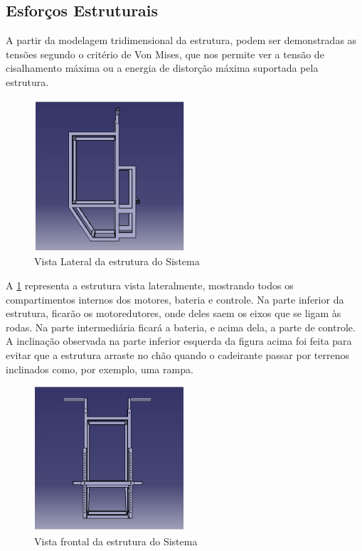  \subsection{Esforços Estruturais}

A partir da modelagem tridimensional da estrutura, podem ser demonstradas as tensões segundo o critério de Von Mises, que nos permite ver a tensão de cisalhamento máxima ou a energia de distorção máxima suportada pela estrutura.

\begin{figure}[!htb]
\centering
\includegraphics[width=0.5\textwidth]{figuras/resultados/vista_lateral_estrutura}
\caption{Vista Lateral da estrutura do Sistema}
\label{fig:vista_lateral_estrutura}
\end{figure}

A \ref{fig:vista_lateral_estrutura} representa a estrutura vista lateralmente, mostrando todos os compartimentos internos dos motores, bateria e controle. Na parte inferior da estrutura, ficarão os motoredutores, onde deles saem os eixos que se ligam às rodas. Na parte intermediária ficará a bateria, e acima dela, a parte de controle. A inclinação observada na parte inferior esquerda da figura acima foi feita para evitar que a estrutura arraste no chão quando o cadeirante passar por terrenos inclinados como, por exemplo, uma rampa.

\begin{figure}[!htb]
\centering
\includegraphics[width=0.5\textwidth]{figuras/resultados/vista_frontal_estrutura}
\caption{Vista frontal da estrutura do Sistema}
\label{fig:vista_frontal_estrutura}
\end{figure}


